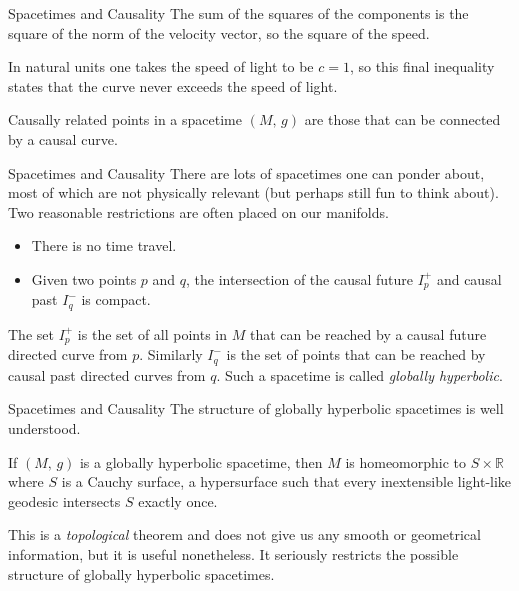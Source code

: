 \documentclass{beamer}
\begin{document}
    \begin{frame}{Spacetimes and Causality}
        The sum of the squares of the components is the square of the norm of
        the velocity vector, so the square of the speed.
        \par\hfill\par
        In natural units one takes the speed of light to be $c=1$, so this
        final inequality states that the curve never exceeds the speed of light.
        \par\hfill\par
        Causally related points in a spacetime $(M,\,g)$ are those that can be
        connected by a causal curve.
    \end{frame}
    \begin{frame}{Spacetimes and Causality}
        There are lots of spacetimes one can ponder about, most of which are
        not physically relevant (but perhaps still fun to think about). Two
        reasonable restrictions are often placed on our manifolds.
        \begin{itemize}
            \item There is no time travel.
            \item Given two points $p$ and $q$, the intersection of the causal
                  future $I_{p}^{+}$ and causal past $I_{q}^{-}$ is compact.
        \end{itemize}
        The set $I_{p}^{+}$ is the set of all points in $M$ that can be reached
        by a causal future directed curve from $p$. Similarly $I_{q}^{-}$ is
        the set of points that can be reached by causal past directed curves
        from $q$. Such a spacetime is called \textit{globally hyperbolic}.
    \end{frame}
    \begin{frame}{Spacetimes and Causality}
        The structure of globally hyperbolic spacetimes is well understood.
        \begin{theorem}
            If $(M,\,g)$ is a globally hyperbolic spacetime, then $M$ is
            homeomorphic to $S\times\mathbb{R}$ where $S$ is a Cauchy surface,
            a hypersurface such that every inextensible light-like geodesic
            intersects $S$ exactly once.
        \end{theorem}
        This is a \textit{topological} theorem and does not give us any smooth
        or geometrical information, but it is useful nonetheless. It seriously
        restricts the possible structure of globally hyperbolic spacetimes.
    \end{frame}
\end{document}
